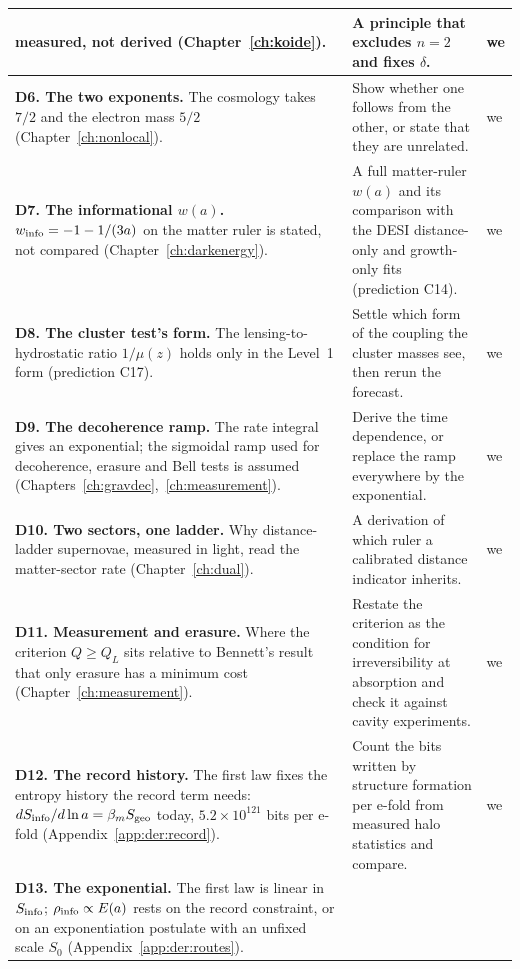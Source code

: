 {\begin{longtable}{@{}>{\raggedright\arraybackslash}p{}>{\raggedright\arraybackslash}p{}>{\raggedright\arraybackslash}p{}@{}}
 measured, not derived (Chapter~\ref{ch:koide}). & A principle that excludes $n=2$ and fixes $\delta$. & we \\\cmidrule[0.2pt]{1-3}
\textbf{D6. The two exponents.} The cosmology takes $7/2$ and the electron mass $5/2$ (Chapter~\ref{ch:nonlocal}).
 & Show whether one follows from the other, or state that they are unrelated. & we \\\cmidrule[0.2pt]{1-3}
\textbf{D7. The informational $w(a)$.} $w_{\rm info}=-1-1/(3a)$ on the matter ruler is stated, not compared (Chapter~\ref{ch:darkenergy}).
 & A full matter-ruler $w(a)$ and its comparison with the DESI distance-only and growth-only fits (prediction C14). & we \\\cmidrule[0.2pt]{1-3}
\textbf{D8. The cluster test's form.} The lensing-to-hydrostatic ratio $1/\mu(z)$ holds only in the Level~1 form (prediction C17).
 & Settle which form of the coupling the cluster masses see, then rerun the forecast. & we \\\cmidrule[0.2pt]{1-3}
\textbf{D9. The decoherence ramp.} The rate integral gives an exponential; the sigmoidal ramp used for decoherence, erasure and Bell
 tests is assumed (Chapters~\ref{ch:gravdec},~\ref{ch:measurement}). & Derive the time dependence, or replace the ramp everywhere by the exponential. & we \\\cmidrule[0.2pt]{1-3}
\textbf{D10. Two sectors, one ladder.} Why distance-ladder supernovae, measured in light, read the matter-sector rate (Chapter~\ref{ch:dual}).
 & A derivation of which ruler a calibrated distance indicator inherits. & we \\\cmidrule[0.2pt]{1-3}
\textbf{D11. Measurement and erasure.} Where the criterion $Q\ge Q_L$ sits relative to Bennett's result that only erasure has a minimum cost
 (Chapter~\ref{ch:measurement}). & Restate the criterion as the condition for irreversibility at absorption and check it against cavity experiments. & we \\\cmidrule[0.2pt]{1-3}
\textbf{D12. The record history.} The first law fixes the entropy history the record term needs: $dS_{\rm info}/d\ln a=\beta_mS_{\rm geo}$
 today, $5.2\times10^{121}$ bits per e-fold (Appendix~\ref{app:der:record}).
 & Count the bits written by structure formation per e-fold from measured halo statistics and compare. & we \\\cmidrule[0.2pt]{1-3}
\textbf{D13. The exponential.} The first law is linear in $S_{\rm info}$; $\rho_{\rm info}\propto E(a)$ rests on the record constraint, or on an
 exponentiation postulate with an unfixed scale $S_0$ (Appendix~\ref{app:der:routes}).

\end{longtable}}
